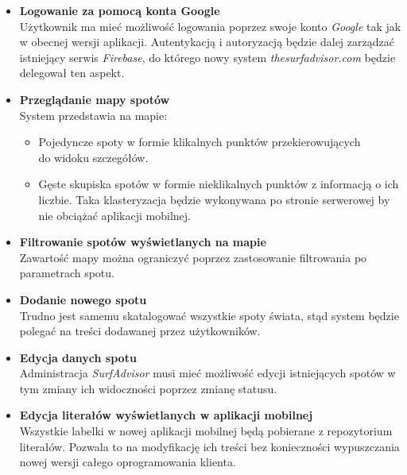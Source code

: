 \begin{itemize}
    \item
    \textbf{Logowanie za pomocą konta Google}\\
    Użytkownik ma mieć możliwość logowania poprzez swoje konto \emph{Google} tak jak w obecnej wersji aplikacji.
    Autentykacją i autoryzacją będzie dalej zarządzać istniejący serwis \emph{Firebase}, do którego nowy system \emph{thesurfadvisor.com} będzie delegował ten aspekt.

    \item
    \textbf{Przeglądanie mapy spotów}\\
    System przedstawia na mapie: 

    \begin{itemize}
    \item
    Pojedyncze spoty w formie klikalnych punktów przekierowujących \\do widoku szczegółów.

    \item
    Gęste skupiska spotów w formie nieklikalnych punktów z informacją o ich liczbie.
    Taka klasteryzacja będzie wykonywana po stronie serwerowej by nie obciążać aplikacji mobilnej.

    \end{itemize}

    \item
    \textbf{Filtrowanie spotów wyświetlanych na mapie}\\
    Zawartość mapy można ograniczyć poprzez zastosowanie filtrowania po parametrach spotu.

    \item
    \textbf{Dodanie nowego spotu}\\
    Trudno jest samemu skatalogować wszystkie spoty świata, stąd system będzie polegać na treści dodawanej przez użytkowników.

    \item
    \textbf{Edycja danych spotu}\\
    Administracja \emph{SurfAdvisor} musi mieć możliwość edycji istniejących spotów w tym zmiany ich widoczności poprzez zmianę statusu.

    \item
    \textbf{Edycja literałów wyświetlanych w aplikacji mobilnej}\\
    Wszystkie labelki w nowej aplikacji mobilnej będą pobierane z repozytorium literałów.
    Pozwala to na modyfikację ich treści bez konieczności wypuszczania nowej wersji całego oprogramowania klienta.
\end{itemize} 


